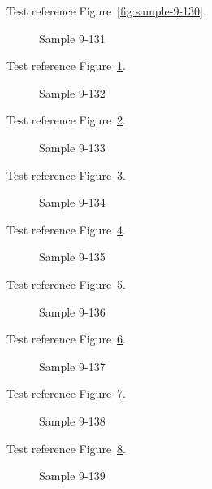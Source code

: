 Test reference Figure~\ref{fig:sample-9-130}.

\begin{figure}[tbhp]
\caption{Sample 9-131}
\label{fig:sample-9-131}
\end{figure}

Test reference Figure~\ref{fig:sample-9-131}.

\begin{figure}[tbhp]
\caption{Sample 9-132}
\label{fig:sample-9-132}
\end{figure}

Test reference Figure~\ref{fig:sample-9-132}.

\begin{figure}[tbhp]
\caption{Sample 9-133}
\label{fig:sample-9-133}
\end{figure}

Test reference Figure~\ref{fig:sample-9-133}.

\begin{figure}[tbhp]
\caption{Sample 9-134}
\label{fig:sample-9-134}
\end{figure}

Test reference Figure~\ref{fig:sample-9-134}.

\begin{figure}[tbhp]
\caption{Sample 9-135}
\label{fig:sample-9-135}
\end{figure}

Test reference Figure~\ref{fig:sample-9-135}.

\begin{figure}[tbhp]
\caption{Sample 9-136}
\label{fig:sample-9-136}
\end{figure}

Test reference Figure~\ref{fig:sample-9-136}.

\begin{figure}[tbhp]
\caption{Sample 9-137}
\label{fig:sample-9-137}
\end{figure}

Test reference Figure~\ref{fig:sample-9-137}.

\begin{figure}[tbhp]
\caption{Sample 9-138}
\label{fig:sample-9-138}
\end{figure}

Test reference Figure~\ref{fig:sample-9-138}.

\begin{figure}[tbhp]
\caption{Sample 9-139}
\label{fig:sample-9-139}
\end{figure}

